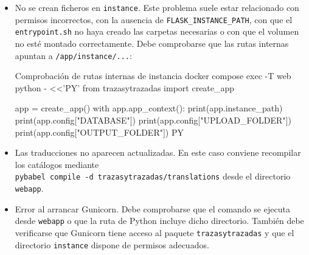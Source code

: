 \begin{itemize}
	\begin{infocmdboxnf}{Entradas recomendadas en .dockerignore}
instance/
webapp/instance/
venv/
.venv/
TFG_env/
.venv-test/
__pycache__/
.pytest_cache/
htmlcov/
	\end{infocmdboxnf}
	
	Los modelos no deben copiarse dentro de la imagen, sino montarse mediante volúmenes. Para liberar espacio puede realizarse una limpieza prudente con:
	
	\begin{dockerboxnf}{Limpieza prudente de imágenes y caché Docker}
docker builder prune -af
docker image prune -af
	\end{dockerboxnf}
	
	No se recomienda utilizar como primera opción \texttt{docker system prune --volumes}, ya que puede eliminar volúmenes persistentes si se están usando para almacenar datos de la aplicación.
	
	\item No se crean ficheros en \texttt{instance}. Este problema suele estar relacionado con permisos incorrectos, con la ausencia de \texttt{FLASK\_INSTANCE\_PATH}, con que el \texttt{entrypoint.sh} no haya creado las carpetas necesarias o con que el volumen no esté montado correctamente. Debe comprobarse que las rutas internas apuntan a \texttt{/app/instance/...}:
	
	\begin{dockerboxnf}{Comprobación de rutas internas de instancia}
docker compose exec -T web python - <<'PY'
from trazasytrazadas import create_app

app = create_app()
with app.app_context():
print(app.instance_path)
print(app.config["DATABASE"])
print(app.config["UPLOAD_FOLDER"])
print(app.config["OUTPUT_FOLDER"])
PY
	\end{dockerboxnf}
	
	\item Las traducciones no aparecen actualizadas. En este caso conviene recompilar los catálogos mediante \\
	\texttt{pybabel compile -d trazasytrazadas/translations} desde el directorio \texttt{webapp}.
	
	\item Error al arrancar Gunicorn. Debe comprobarse que el comando se ejecuta desde \texttt{webapp} o que la ruta de Python incluye dicho directorio. También debe verificarse que Gunicorn tiene acceso al paquete \texttt{trazasytrazadas} y que el directorio \texttt{instance} dispone de permisos adecuados.
	

\end{itemize}
